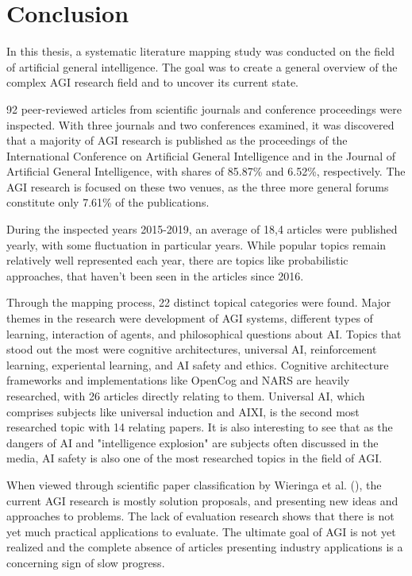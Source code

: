 \chapter{Conclusion}
\label{chap:conclusion}

In this thesis, a systematic literature mapping study was conducted on the field
of artificial general intelligence. The goal was to create a general overview of
the complex AGI research field and to uncover its current state. 

92 peer-reviewed articles from scientific journals and conference proceedings
were inspected. With three journals and two conferences examined, it was
discovered that a majority of AGI research is published as the proceedings of the
International Conference on Artificial General Intelligence and in the Journal
of Artificial General Intelligence, with shares of 85.87\% and 6.52\%,
respectively. The AGI research is focused on these two venues, as the three more
general forums constitute only 7.61\% of the publications.

During the inspected years 2015-2019, an average of 18,4 articles were published
yearly, with some fluctuation in particular years. While popular topics remain
relatively well represented each year, there are topics like probabilistic
approaches, that haven't been seen in the articles since 2016.

Through the mapping process, 22 distinct topical categories were found. Major
themes in the research were development of AGI systems, different types of
learning, interaction of agents, and philosophical questions about AI. Topics
that stood out the most were cognitive architectures, universal AI,
reinforcement learning, experiental learning, and AI safety and ethics.
Cognitive architecture frameworks and implementations like OpenCog and NARS are
heavily researched, with 26 articles directly relating to them. Universal AI,
which comprises subjects like universal induction and AIXI, is the second most
researched topic with 14 relating papers. It is also interesting to see that as
the dangers of AI and "intelligence explosion" are subjects often discussed in
the media, AI safety is also one of the most researched topics in the field of
AGI.

When viewed through scientific paper classification by Wieringa et al.
(\cite{wieringa2006}), the current AGI research is mostly solution proposals,
and presenting new ideas and approaches to problems. The lack of evaluation
research shows that there is not yet much practical applications to evaluate.
The ultimate goal of AGI is not yet realized and the complete absence of
articles presenting industry applications is a concerning sign of slow progress.

